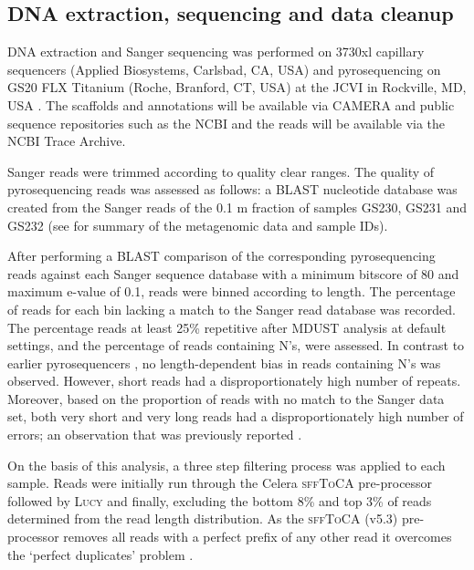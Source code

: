\subsection{\textsc{DNA} extraction, sequencing and data cleanup}
\textsc{DNA} extraction and Sanger sequencing was performed on 3730xl capillary sequencers (Applied Biosystems, Carlsbad, \textsc{CA}, \textsc{USA}) and pyrosequencing on \textsc{GS20 FLX} Titanium (Roche, Branford, \textsc{CT}, \textsc{USA}) at the \acl{JCVI} in Rockville, \textsc{MD}, \textsc{USA} \cite{Rusch2007}. 
The scaffolds and annotations will be available via \ac{CAMERA} and public sequence repositories such as the \ac{NCBI} and the reads will be available via the \ac{NCBI} Trace Archive. 

Sanger reads were trimmed according to quality clear ranges.
The quality of pyrosequencing reads was assessed as follows: 
a \ac{BLAST} nucleotide database was created from the Sanger reads of the 0.1 \textmu{}m fraction of samples GS230, GS231 and GS232 (see  for summary of the metagenomic data and sample IDs).

After performing a \ac{BLAST} comparison of the corresponding pyrosequencing reads against each Sanger sequence database with a minimum bitscore of 80 and maximum e-value of 0.1, reads were binned according to length.
The percentage of reads for each bin lacking a match to the Sanger read database was recorded. 
The percentage reads at least 25\% repetitive after \textsc{MDUST} \cite{Morgulis2006} analysis at default settings, and the percentage of reads containing N's, were assessed. 
In contrast to earlier pyrosequencers \cite{Huse2007}, no length-dependent bias in reads containing N's was observed. 
However, short reads had a disproportionately high number of repeats. 
Moreover, based on the proportion of reads with no match to the Sanger data set, both very short and very long reads had a disproportionately high number of errors; an observation that was previously reported \cite{Huse2007}.

On the basis of this analysis, a three step filtering process was applied to each sample. 
Reads were initially run through the Celera \textsc{sffToCA} \cite{Miller2008} pre-processor followed by \textsc{Lucy} \cite{Chou2001} and finally, excluding the bottom 8\% and top 3\% of reads determined from the read length distribution. 
As the \textsc{sffToCA} (v5.3) pre-processor removes all reads with a perfect prefix of any other read it overcomes the `perfect duplicates' problem \cite{Gomez-Alvarez2009}.
 
